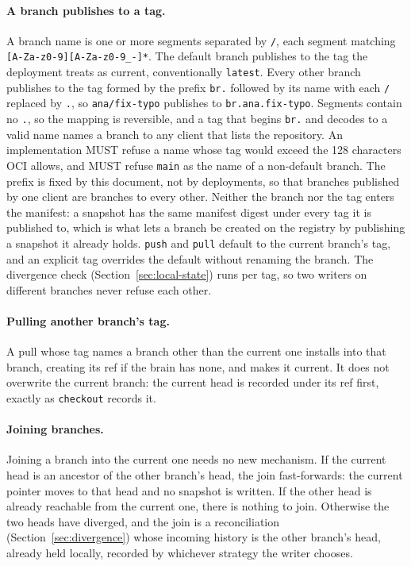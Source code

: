 \documentclass[11pt,a4paper]{article}
\begin{document}
\paragraph{A branch publishes to a tag.}
A branch name is one or more segments separated by \texttt{/}, each segment
matching \texttt{[A-Za-z0-9][A-Za-z0-9\_-]*}. The default branch publishes to
the tag the deployment treats as current, conventionally \texttt{latest}.
Every other branch publishes to the tag formed by the prefix \texttt{br.}
followed by its name with each \texttt{/} replaced by \texttt{.}, so
\texttt{ana/fix-typo} publishes to \texttt{br.ana.fix-typo}. Segments contain
no \texttt{.}, so the mapping is reversible, and a tag that begins
\texttt{br.} and decodes to a valid name names a branch to any client that
lists the repository. An implementation MUST refuse a name whose tag would
exceed the 128 characters OCI allows, and MUST refuse \texttt{main} as the
name of a non-default branch. The prefix is fixed by this document, not by
deployments, so that branches published by one client are branches to every
other. Neither the branch nor the tag enters the manifest: a snapshot has the
same manifest digest under every tag it is published to, which is what lets a
branch be created on the registry by publishing a snapshot it already holds.
\texttt{push} and \texttt{pull} default to the current branch's tag, and an
explicit tag overrides the default without renaming the branch. The
divergence check (Section~\ref{sec:local-state}) runs per tag, so two writers
on different branches never refuse each other.

\paragraph{Pulling another branch's tag.}
A pull whose tag names a branch other than the current one installs into that
branch, creating its ref if the brain has none, and makes it current. It does
not overwrite the current branch: the current head is recorded under its ref
first, exactly as \texttt{checkout} records it.

\paragraph{Joining branches.}
Joining a branch into the current one needs no new mechanism. If the current
head is an ancestor of the other branch's head, the join fast-forwards: the
current pointer moves to that head and no snapshot is written. If the other
head is already reachable from the current one, there is nothing to join.
Otherwise the two heads have diverged, and the join is a reconciliation
(Section~\ref{sec:divergence}) whose incoming history is the other branch's
head, already held locally, recorded by whichever strategy the writer
chooses.
\end{document}
